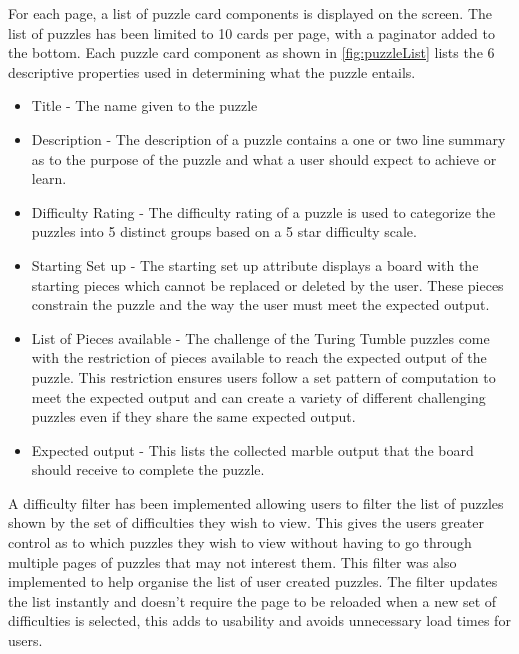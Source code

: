 \documentclass{l4proj}
\begin{document}
For each page, a list of puzzle card components is displayed on the screen. The list of puzzles has been limited to 10 cards per page, with a paginator added to the bottom. Each puzzle card component as shown in \ref{fig:puzzleList} lists the 6 descriptive properties used in determining what the puzzle entails. 
\begin{itemize}
    \item Title - The name given to the puzzle
    \item Description - The description of a puzzle contains a one or two line summary as to the purpose of the puzzle and what a user should expect to achieve or learn.
    \item Difficulty Rating - The difficulty rating of a puzzle is used to categorize the puzzles into 5 distinct groups based on a 5 star difficulty scale.
    \item Starting Set up - The starting set up attribute displays a board with the starting pieces which cannot be replaced or deleted by the user. These pieces constrain the puzzle and the way the user must meet the expected output.
    \item List of Pieces available - The challenge of the Turing Tumble puzzles come with the restriction of pieces available to reach the expected output of the puzzle. This restriction ensures users follow a set pattern of computation to meet the expected output and can create a variety of different challenging puzzles even if they share the same expected output.
    \item Expected output - This lists the collected marble output that the board should receive to complete the puzzle.
\end{itemize}

A difficulty filter has been implemented allowing users to filter the list of puzzles shown by the set of difficulties they wish to view. This gives the users greater control as to which puzzles they wish to view without having to go through multiple pages of puzzles that may not interest them. This filter was also implemented to help organise the list of user created puzzles. The filter updates the list instantly and doesn't require the page to be reloaded when a new set of difficulties is selected, this adds to usability and avoids unnecessary load times for users.


\end{document}
